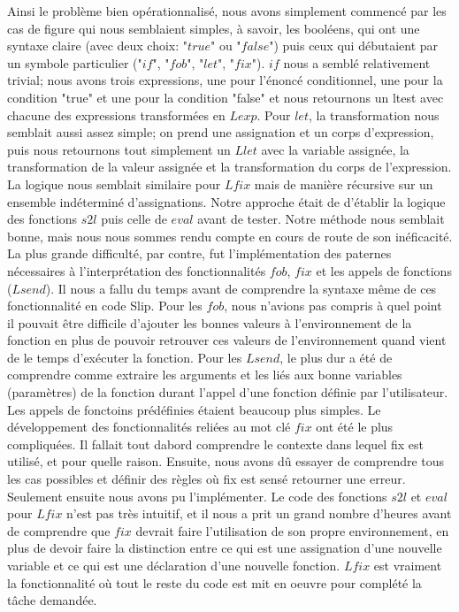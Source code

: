 \documentclass{article}
\begin{document}
	Ainsi le problème bien opérationnalisé, nous avons simplement commencé par les
	cas de figure qui nous semblaient simples, à savoir, les booléens, qui ont une syntaxe claire (avec deux choix: "$true$" ou "$false$") puis ceux qui débutaient
	par un symbole particulier ("$if$", "$fob$", "$let$", "$fix$"). $if$ nous a semblé
	relativement trivial; nous avons trois expressions, une pour l'énoncé conditionnel,
	une pour la condition "true" et une pour la condition "false" et nous
	retournons un ltest avec chacune des expressions transformées en $Lexp$. Pour $l
	et$, la transformation nous semblait aussi assez simple; on prend une assignation
	et un corps d'expression, puis nous retournons tout simplement un $Llet$ avec
	la variable assignée, la transformation de la valeur assignée et la transformation
	du corps de l'expression. La logique nous semblait similaire pour $Lfix$ mais
	de manière récursive sur un ensemble indéterminé d'assignations. Notre approche
	était de d'établir la logique des fonctions $s2l$ puis celle de $eval$ avant de
	tester. Notre méthode nous semblait bonne, mais nous nous sommes rendu compte en
	cours de route de son inéficacité. La plus grande difficulté, par contre, fut
	l'implémentation des paternes nécessaires à l'interprétation des
	fonctionnalités $fob$, $fix$ et les appels de fonctions ($Lsend$). Il nous a
	fallu du temps avant de comprendre la syntaxe même de ces fonctionnalité en
	code Slip. Pour les $fob$, nous n'avions pas compris à quel point il pouvait
	être difficile d'ajouter les bonnes valeurs à l'environnement de la fonction
	en plus de pouvoir retrouver ces valeurs de l'environnement quand vient de le
	temps d'exécuter la fonction. Pour les $Lsend$, le plus dur a été de
	comprendre comme extraire les arguments et les liés aux bonne variables (paramètres)
	de la fonction durant l'appel d'une fonction définie par l'utilisateur. Les appels
	de fonctoins prédéfinies étaient beaucoup plus simples. Le développement des
	fonctionnalités reliées au mot clé $fix$ ont été le plus compliquées. Il fallait
	tout dabord comprendre le contexte dans lequel fix est utilisé, et pour quelle
	raison. Ensuite, nous avons dû essayer de comprendre tous les cas possibles et
	définir des règles où fix est sensé retourner une erreur. Seulement ensuite nous
	avons pu l'implémenter. Le code des fonctions $s2l$ et $eval$ pour $Lfix$ n'est
	pas très intuitif, et il nous a prit un grand nombre d'heures avant de comprendre
	que $fix$ devrait faire l'utilisation de son propre environnement, en plus de
	devoir faire la distinction entre ce qui est une assignation d'une nouvelle
	variable et ce qui est une déclaration d'une nouvelle fonction. $Lfix$ est vraiment
	la fonctionnalité où tout le reste du code est mit en oeuvre pour complété la tâche
	demandée.
\end{document}
